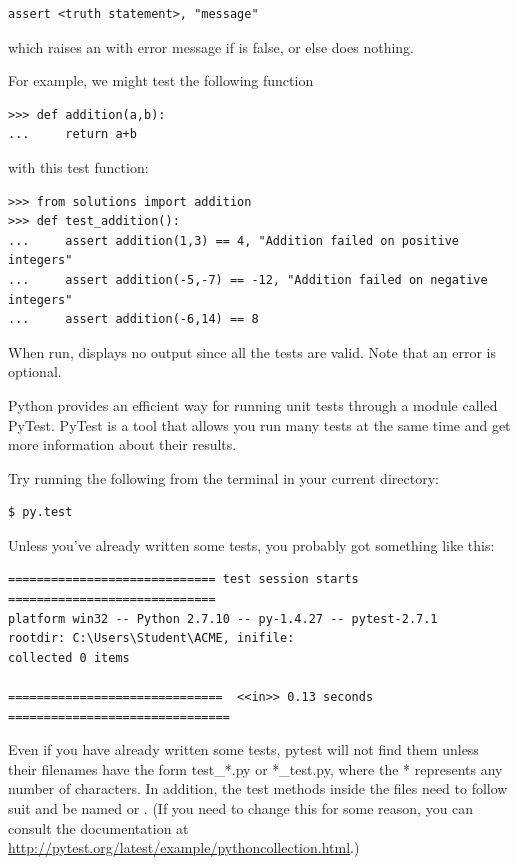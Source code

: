 \begin{lstlisting}
assert <truth statement>, "message"
\end{lstlisting}

which raises an  with error message  if  is false, or else does nothing.

For example, we might test the following function

\begin{lstlisting}
>>> def addition(a,b):
...     return a+b
\end{lstlisting}

with this test function:

\begin{lstlisting}
>>> from solutions import addition
>>> def test_addition():
...     assert addition(1,3) == 4, "Addition failed on positive integers"
...     assert addition(-5,-7) == -12, "Addition failed on negative integers"
...     assert addition(-6,14) == 8
\end{lstlisting}

When run,  displays no output since all the tests are valid. Note that an error is optional.

Python provides an efficient way for running unit tests through a module called PyTest. PyTest is a tool that allows you run many tests at the same time and get more information about their results.

Try running the following from the terminal in your current directory:

\begin{lstlisting}
$ py.test
\end{lstlisting}

Unless you've already written some tests, you probably got something like this:

\begin{lstlisting}
============================= test session starts =============================
platform win32 -- Python 2.7.10 -- py-1.4.27 -- pytest-2.7.1
rootdir: C:\Users\Student\ACME, inifile:
collected 0 items

==============================  <<in>> 0.13 seconds ===============================
\end{lstlisting}

Even if you have already written some tests, pytest will not find them unless their filenames have the form test\_*.py or *\_test.py, where the * represents any number of characters.
In addition, the test methods inside the files need to follow suit and be named  or .
(If you need to change this for some reason, you can consult the documentation at \url{http://pytest.org/latest/example/pythoncollection.html}.)

